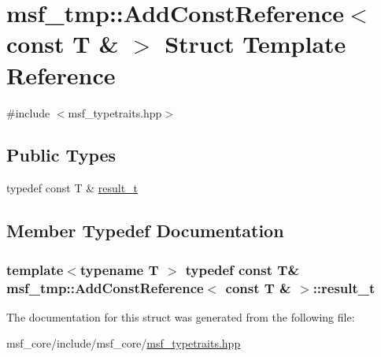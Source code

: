 \hypertarget{structmsf__tmp_1_1AddConstReference_3_01const_01T_01_6_01_4}{\section{msf\-\_\-tmp\-:\-:Add\-Const\-Reference$<$ const T \& $>$ Struct Template Reference}
\label{structmsf__tmp_1_1AddConstReference_3_01const_01T_01_6_01_4}
}


{\ttfamily \#include $<$msf\-\_\-typetraits.\-hpp$>$}

\subsection*{Public Types}
\begin{DoxyCompactItemize}
\item 
typedef const T \& \hyperlink{structmsf__tmp_1_1AddConstReference_3_01const_01T_01_6_01_4_ae1c3b92a3c461c4072590a2389bb272a}{result\-\_\-t}
\end{DoxyCompactItemize}


\subsection{Member Typedef Documentation}
\hypertarget{structmsf__tmp_1_1AddConstReference_3_01const_01T_01_6_01_4_ae1c3b92a3c461c4072590a2389bb272a}{
\subsubsection[{result\-\_\-t}]{\setlength{\rightskip}{0pt plus 5cm}template$<$typename T $>$ typedef const T\& {\bf msf\-\_\-tmp\-::\-Add\-Const\-Reference}$<$ const T \& $>$\-::{\bf result\-\_\-t}}}\label{structmsf__tmp_1_1AddConstReference_3_01const_01T_01_6_01_4_ae1c3b92a3c461c4072590a2389bb272a}


The documentation for this struct was generated from the following file\-:\begin{DoxyCompactItemize}
\item 
msf\-\_\-core/include/msf\-\_\-core/\hyperlink{msf__typetraits_8hpp}{msf\-\_\-typetraits.\-hpp}\end{DoxyCompactItemize}
